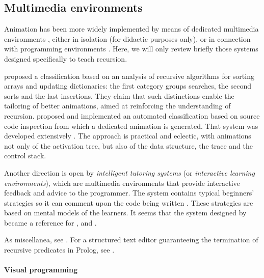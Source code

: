 \documentclass[11pt,a4paper]{article}
\newcommand\plang[1]{\textsf{#1}\xspace}
\begin{document}
\subsection{Multimedia environments}
\label{multimedia}

Animation has been more widely implemented by means of dedicated
multimedia environments \citep{Rosenthal:2005}, either in isolation
(for didactic purposes only), or in connection with programming
environments \citep{WilcoksSanders:1994}. Here, we will only review
briefly those systems designed specifically to teach recursion.

\textcite{SternNaish:2002a} \citeyearpar{SternNaish:2002b} proposed a
classification based on an analysis of recursive algorithms for
sorting arrays and updating dictionaries: the first category groups
searches, the second sorts and the last insertions. They claim that
such distinctions enable the tailoring of better animations, aimed at
reinforcing the understanding of
recursion. \textcite{FernandezPerezVelazquezUrquiza:2007} proposed and
implemented an automated classification based on source code
inspection from which a dedicated animation is generated. That system
was developed extensively \citep{VelazquezPerezUrquiza:2008}
\citeyearpar{VelazquezPerezUrquiza:2009b}
\citeyearpar{VelazquezPerezUrquiza:2009a}
\citep{VelazquezPerez:2010}. The approach is practical and eclectic,
with animations not only of the activation tree, but also of the data
structure, the trace and the control stack.

Another direction is open by \emph{intelligent tutoring systems}
\citep{Pirolli:1986} (or \emph{interactive learning environments}),
which are multimedia environments that provide interactive feedback
and advice to the programmer. The system contains typical beginners'
strategies so it can comment upon the code being written
\citep{McCallaGreer:1993}. These strategies are based on mental models
of the learners. It seems that the system designed by
\textcite{Greer:1987} became a reference for
\textcite{BhuiyanGreerGordon:1989} \citeyearpar{BhuiyanGreerGordon:1992}
\citeyearpar{BhuiyanGreerGordon:1994}, \textcite{Bhuiyan:1992} and
\textcite{GreerMcCallaPriceHolt:1994}.

As miscellanea, see
\textcite{Moreno:1992,WuLinChiou:1996,WuLeeMei:1998}. For a structured
text editor guaranteeing the termination of recursive predicates in
\plang{Prolog}, see \textcite{BundyGrosseBrna:1991}.

\paragraph{Visual programming}
\end{document}
